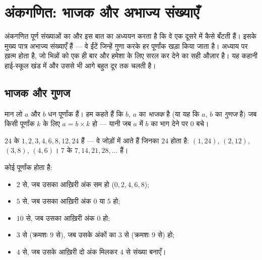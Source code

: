 \chapter{अंकगणित: भाजक और अभाज्य संख्याएँ}\label{ch:g9:arith}

अंकगणित पूर्ण संख्याओं का और इस बात का अध्ययन करता है कि वे एक दूसरे
में कैसे बँटती हैं। इसके मुख्य पात्र अभाज्य संख्याएँ हैं --- वे ईंटें
जिन्हें गुणा करके हर पूर्णांक खड़ा किया जाता है। अध्याय  पर ख़त्म होता है, जो भिन्नों को एक ही बार और हमेशा के लिए
सरल कर देने का सही औज़ार है। यह कहानी हाई-स्कूल खंड में और उससे भी आगे
बहुत दूर तक चलती है।

\section{भाजक और गुणज}

\begin{definition}[भाजक, गुणज]\label{def:g9:arith:divisor}
मान लो $a$ और $b$ धन पूर्णांक हैं। हम कहते हैं कि $b$, $a$ का
\emph{भाजक} है (या यह कि $a$, $b$ का
\emph{गुणज} है) जब किसी पूर्णांक $k$ के लिए
$a = b \times k$ हो --- यानी जब $a$ में $b$ का भाग देने पर  $0$
बचे।
\end{definition}

\begin{example}
$24$ के  $1, 2, 3, 4, 6, 8, 12, 24$ हैं --- वे जोड़ों में आते हैं
जिनका  $24$ होता है: $(1,24)$, $(2,12)$, $(3,8)$, $(4,6)$। $7$
के  $7, 14, 21, 28, \dots$ हैं।
\end{example}

\begin{proposition}[विभाज्यता की तरकीबें]\label{prop:g9:arith:rules}
कोई पूर्णांक  होता है:
\begin{itemize}
  \item $2$ से, जब उसका आख़िरी अंक सम हो ($0, 2, 4, 6, 8$);
  \item $5$ से, जब उसका आख़िरी अंक $0$ या $5$ हो;
  \item $10$ से, जब उसका आख़िरी अंक $0$ हो;
  \item $3$ से (क्रमशः $9$ से), जब उसके अंकों का  $3$ से (क्रमशः
        $9$ से)  हो;
  \item $4$ से, जब उसके आख़िरी दो अंक मिलकर $4$ से  संख्या बनाएँ।
\end{itemize}
\end{proposition}
\admitted

